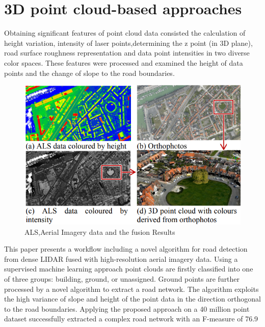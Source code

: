 \section{3D point cloud-based approaches}
Obtaining significant features of point cloud data consisted
the calculation of height variation, intensity of laser points,determining the z point (in 3D plane), road surface roughness representation and data point intensities in two diverse color spaces. These features were processed and examined the height of data points and the change of slope to the road boundaries\cite{R16}. 
\begin{figure}[H]
    \centering
    \includegraphics{Figures/chapter2/3dmethod1.png}
    \caption{ALS,Aerial Imagery data and the fusion Results}
    \label{fig:3d1}
\end{figure}

\noindent
This paper presents a workflow including a novel algorithm for road detection from dense LIDAR fused with high-resolution aerial imagery data. Using a supervised machine learning approach point clouds are firstly classified into one of three groups: building, ground, or unassigned. Ground points are further processed by a novel algorithm to extract a road network. The algorithm exploits the high variance of slope and height of the point data in the direction orthogonal to the road boundaries. Applying the proposed approach on a 40 million point dataset successfully extracted a complex road network with an F-measure of 76.9%

